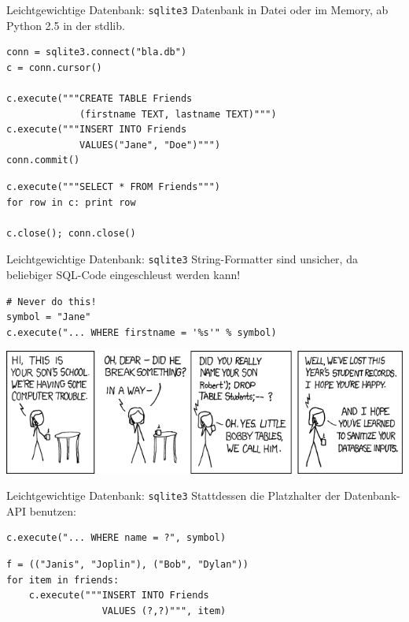 \begin{frame}[fragile]{Leichtgewichtige Datenbank: \texttt{sqlite3}}
Datenbank in Datei oder im Memory, ab Python 2.5 in der stdlib.
\begin{lstlisting}[style=Python]
conn = sqlite3.connect("bla.db")
c = conn.cursor()

c.execute("""CREATE TABLE Friends
             (firstname TEXT, lastname TEXT)""")
c.execute("""INSERT INTO Friends
             VALUES("Jane", "Doe")""")
conn.commit()
\end{lstlisting}
\begin{lstlisting}[style=Python]
c.execute("""SELECT * FROM Friends""")
for row in c: print row

c.close(); conn.close()
\end{lstlisting}
\end{frame}

\begin{frame}[fragile]{Leichtgewichtige Datenbank: \texttt{sqlite3}}
String-Formatter sind unsicher, da beliebiger SQL-Code eingeschleust werden kann!
\begin{lstlisting}[style=Python]
# Never do this!
symbol = "Jane"
c.execute("... WHERE firstname = '%s'" % symbol)
\end{lstlisting}
\vspace{2mm}
\includegraphics[width=\textwidth]{images/exploits_of_a_mom.png}
\end{frame}

\begin{frame}[fragile]{Leichtgewichtige Datenbank: \texttt{sqlite3}}
Stattdessen die Platzhalter der Datenbank-API benutzen:
\begin{lstlisting}[style=Python]
c.execute("... WHERE name = ?", symbol)
\end{lstlisting}
\begin{lstlisting}[style=Python]
f = (("Janis", "Joplin"), ("Bob", "Dylan"))
for item in friends:
    c.execute("""INSERT INTO Friends 
                 VALUES (?,?)""", item)
\end{lstlisting}
\end{frame}


